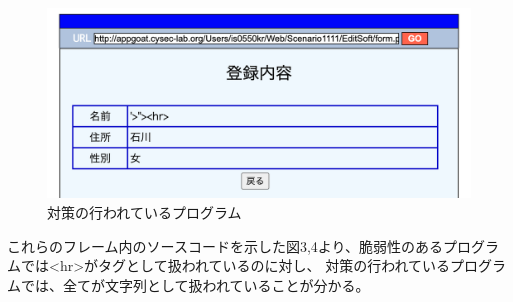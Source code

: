 \documentclass[dvipdfmx,autodetect-engine,titlepage]{jsarticle}
\begin{document}
\begin{figure}[H]
  \centering
  \includegraphics[scale=0.35]{web1.png}
  \caption{対策の行われているプログラム}\label{fig:図1}
\end{figure}

これらのフレーム内のソースコードを示した図3,4より、脆弱性のあるプログラムでは\textless hr\textgreater がタグとして扱われているのに対し、
対策の行われているプログラムでは、全てが文字列として扱われていることが分かる。\\
\end{document}
